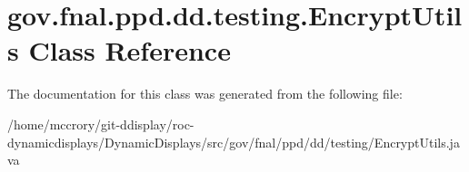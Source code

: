 \hypertarget{classgov_1_1fnal_1_1ppd_1_1dd_1_1testing_1_1EncryptUtils}{\section{gov.\-fnal.\-ppd.\-dd.\-testing.\-Encrypt\-Utils Class Reference}
\label{classgov_1_1fnal_1_1ppd_1_1dd_1_1testing_1_1EncryptUtils}
}


The documentation for this class was generated from the following file\-:\begin{DoxyCompactItemize}
\item 
/home/mccrory/git-\/ddisplay/roc-\/dynamicdisplays/\-Dynamic\-Displays/src/gov/fnal/ppd/dd/testing/Encrypt\-Utils.\-java\end{DoxyCompactItemize}
